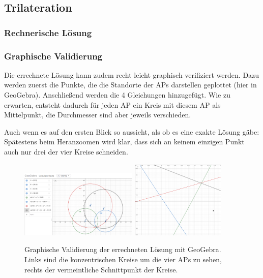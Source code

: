 \subsection{Trilateration}

\subsubsection*{Rechnerische Lösung}

\subsubsection*{Graphische Validierung}

Die errechnete Lösung kann zudem recht leicht graphisch verifiziert werden. Dazu werden zuerst die Punkte, die die Standorte der APs darstellen geplottet (hier in GeoGebra). Anschließend werden die 4 Gleichungen hinzugefügt. Wie zu erwarten, entsteht dadurch für jeden AP ein Kreis mit diesem AP als Mittelpunkt, die Durchmesser sind aber jeweils verschieden.

Auch wenn es auf den ersten Blick so aussieht, als ob es eine exakte Lösung gäbe: Spätestens beim Heranzoomen wird klar, dass sich an keinem einzigen Punkt auch nur drei der vier Kreise schneiden.

\begin{figure}[H]
    \centering
    \includegraphics[width=0.5\textwidth]{figures/geogebra/screen_2.png}
    \includegraphics[width=0.4\textwidth]{figures/geogebra/screen_3.png}
    \caption{Graphische Validierung der errechneten Lösung mit GeoGebra. Links sind die konzentrischen Kreise um die vier APs zu sehen, rechts der vermeintliche Schnittpunkt der Kreise.}
    \label{geogebra}
\end{figure}